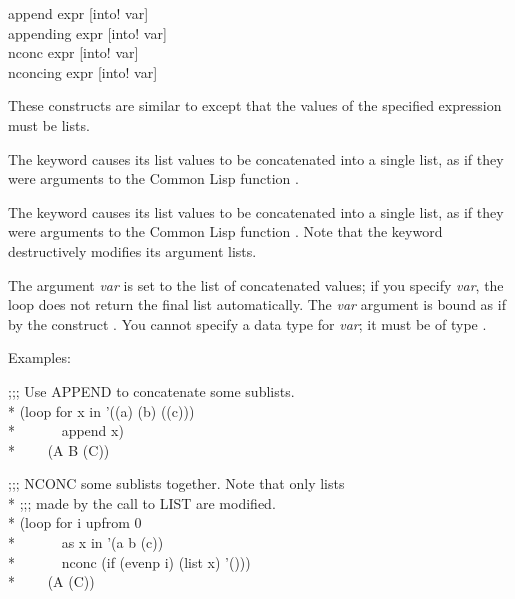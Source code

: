 \begin{defloop}
append expr [\!into! var] \\
appending expr [\!into! var] \\
nconc expr [\!into! var] \\
nconcing expr [\!into! var]

These constructs are similar to  except that the
values of the specified expression must be lists.  

The  keyword causes its list values to be concatenated 
into a single list, as if 
they were arguments to the Common Lisp function .

The  keyword causes its list values to be concatenated
into a single list,
as if they were arguments to the Common Lisp function .  
Note that the  keyword destructively modifies its argument lists.

The argument {\it var\/} is 
set to the list of concatenated values; if you specify {\it var}, the loop
does not return the final list automatically.  The {\it var\/} argument
is bound as if by the construct .
You cannot specify a data type for {\it var\/}; it must be of type .


Examples:
\begin{lisp}
;;; Use APPEND to concatenate some sublists. \\*
(loop for x in '((a) (b) ((c))) \\*
~~~~~~append x) \\*
~~~\EV~(A B (C))
\end{lisp}
\begin{lisp}
;;; NCONC some sublists together.  Note that only lists \\*
;;; made by the call to LIST are modified. \\*
(loop for i upfrom 0  \\*
~~~~~~as x in '(a b (c)) \\*
~~~~~~nconc (if (evenp i) (list x) '())) \\*
~~~\EV~(A (C))
\end{lisp}
\end{defloop}


